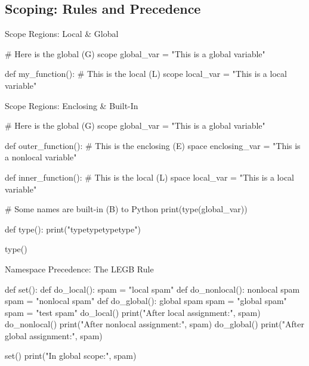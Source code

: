\documentclass[11pt,table]{beamer}
\begin{document}
\subsection{Scoping: Rules and Precedence}
\begin{frame}[fragile]{Scope Regions: Local \& Global}

\begin{mintypython}
# Here is the global (G) scope
global_var = "This is a global variable"

def my_function():
    # This is the local (L) scope
    local_var = "This is a local variable"
\end{mintypython}


\end{frame}


\begin{frame}[fragile]{Scope Regions: Enclosing \& Built-In}

\begin{mintypython}
# Here is the global (G) scope
global_var = "This is a global variable"

def outer_function():
    # This is the enclosing (E) space
    enclosing_var = "This is a nonlocal variable"

    def inner_function():
        # This is the local (L) space
        local_var = "This is a local variable"

# Some names are built-in (B) to Python
print(type(global_var))

def type():
    print("typetypetypetype")

type()
\end{mintypython}

\end{frame}


\begin{frame}[fragile]{Namespace Precedence: The LEGB Rule}

\begin{mintypython}
def set():
    def do_local():
        spam = "local spam"
    def do_nonlocal():
        nonlocal spam
        spam = "nonlocal spam"
    def do_global():
        global spam
        spam = "global spam"
    spam = "test spam"
    do_local()
    print("After local assignment:", spam)
    do_nonlocal()
    print("After nonlocal assignment:", spam)
    do_global()
    print("After global assignment:", spam)

set()
print("In global scope:", spam)
\end{mintypython}

\end{frame}
\end{document}
